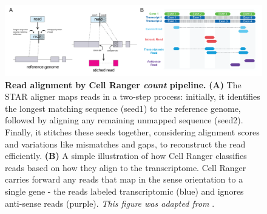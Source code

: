 \begin{figure}[H]
    \centering
    \includegraphics[width=\linewidth]{Chapter1/Fig/F1-10-02.png}
    \caption[Read alignment by Cell Ranger \textit{count}]{\textbf{Read alignment by Cell Ranger \textit{count} pipeline.} \textbf{(A)} The STAR aligner maps reads in a two-step process: initially, it identifies the longest matching sequence (seed1) to the reference genome, followed by aligning any remaining unmapped sequence (seed2). Finally, it stitches these seeds together, considering alignment scores and variations like mismatches and gaps, to reconstruct the read efficiently. \textbf{(B)} A simple illustration of how Cell Ranger classifies reads based on how they align to the transcriptome. Cell Ranger carries forward any reads that map in the sense orientation to a single gene - the reads labeled transcriptomic (blue) and ignores anti-sense reads (purple). \textit{This figure was adapted from }\textbf{\cite{harvard_chan_bioinformatics_core_hbc_alignment_2017,noauthor_cell_nodate}}.}
   \label{fig:chp1_alignment}
\end{figure}





